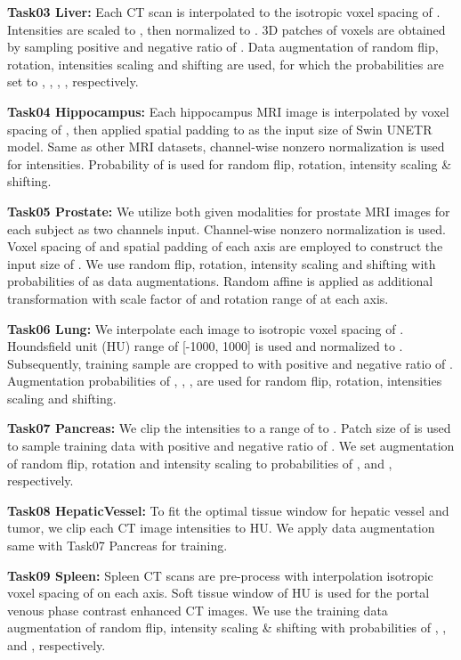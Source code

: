 \documentclass[10pt,twocolumn,letterpaper]{article}
\begin{document}
\noindent\textbf{Task03 Liver: } Each CT scan is interpolated to the isotropic voxel spacing of  . Intensities are scaled to , then normalized to . 3D patches of  voxels are obtained by sampling positive and negative ratio of . Data augmentation of random flip, rotation, intensities scaling and shifting are used, for which the probabilities are set to , , , , respectively.

\noindent\textbf{Task04 Hippocampus: } Each hippocampus MRI image is interpolated by voxel spacing of , then applied spatial padding to  as the input size of Swin UNETR model. Same as other MRI datasets, channel-wise nonzero normalization is used for intensities. Probability of  is used for random flip, rotation, intensity scaling \& shifting. 

\noindent\textbf{Task05 Prostate: } We utilize both given modalities for prostate MRI images for each subject as two channels input. Channel-wise nonzero normalization is used. Voxel spacing of  and spatial padding of each axis are employed to construct the input size of . We use random flip, rotation, intensity scaling and shifting with probabilities of  as data augmentations. Random affine is applied as additional transformation with scale factor of  and rotation range of  at each axis.

\noindent\textbf{Task06 Lung: } We interpolate each image to isotropic voxel spacing of . Houndsfield unit (HU) range of [-1000, 1000] is used and normalized to . Subsequently, training sample are cropped to  with positive and negative ratio of . Augmentation probabilities of , , ,  are used for random flip, rotation, intensities scaling and shifting. 

\noindent\textbf{Task07 Pancreas: } We clip the intensities to a range of  to . Patch size of  is used to sample training data with positive and negative ratio of . We set augmentation of random flip, rotation and intensity scaling to probabilities of ,  and , respectively.


\noindent\textbf{Task08 HepaticVessel: } To fit the optimal tissue window for hepatic vessel and tumor, we clip each CT image intensities to  HU. We apply data augmentation same with Task07 Pancreas for training.

\noindent\textbf{Task09 Spleen: } Spleen CT scans are pre-process with interpolation isotropic voxel spacing of   on each axis. Soft tissue window of  HU is used for the portal venous phase contrast enhanced CT images. We use the training data augmentation of random flip, intensity scaling \& shifting with probabilities of , , and , respectively.
\end{document}
